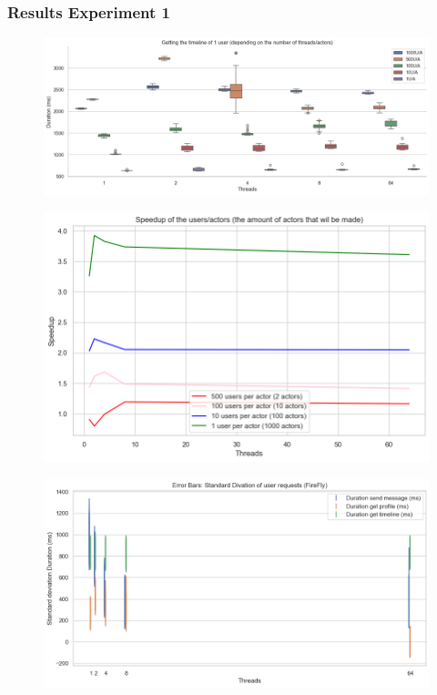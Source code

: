 \documentclass[a4paper]{article}
\begin{document}
\subsubsection{Results Experiment 1}
\begin{figure}[H]
	\centering
	\includegraphics[width = \linewidth]{Images/Speedup(U:A)Box.png}
	\caption{}
\end{figure}
\begin{figure}[H]
	\centering
	\includegraphics[width = \linewidth]{Images/Speedup(U:A).png}
	\caption{}
\end{figure}
\begin{figure}[H]
	\centering
	\includegraphics[width = \linewidth]{Images/SpeedupStdURFirefly.png}
	\caption{}
\end{figure}
\end{document}
